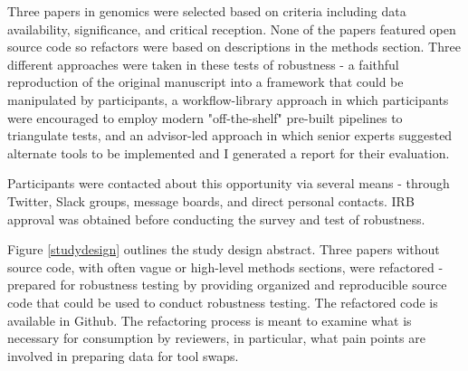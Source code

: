 \documentclass{drexelthesis}
\begin{document}
Three papers in genomics were selected based on criteria including data availability, significance, and critical reception. None of the papers featured open source code so refactors were based on descriptions in the methods section. Three different approaches were taken in these tests of robustness - a faithful reproduction of the original manuscript into a framework that could be manipulated by participants, a workflow-library approach in which participants were encouraged to employ modern "off-the-shelf" pre-built pipelines to triangulate tests, and an advisor-led approach in which senior experts suggested alternate tools to be implemented and I generated a report for their evaluation.

Participants were contacted about this opportunity via several means - through Twitter, Slack groups, message boards, and direct personal contacts. IRB approval was obtained before conducting the survey and test of robustness.

Figure \ref{studydesign} outlines the study design abstract. Three papers without source code, with often vague or high-level methods sections, were refactored - prepared for robustness testing by providing organized and reproducible source code that could be used to conduct robustness testing. The refactored code is available in Github. The refactoring process is meant to examine what is necessary for consumption by reviewers, in particular, what pain points are involved in preparing data for tool swaps.
\end{document}
